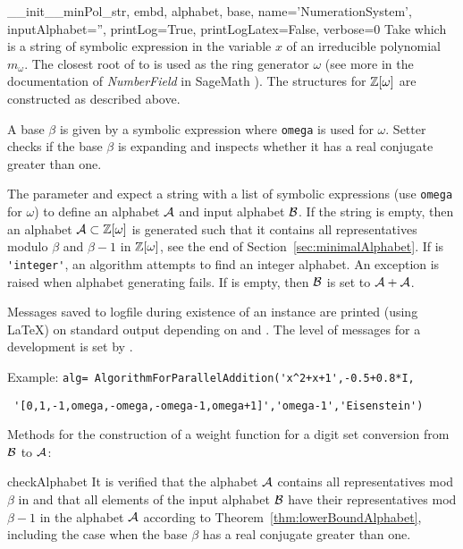 \begin{method}{\_\_init\_\_}{minPol\_str, embd, alphabet, base, name='NumerationSystem', inputAlphabet='', printLog=True, printLogLatex=False, verbose=0}
Take  which is a string of symbolic expression in the variable $x$ of an irreducible polynomial~$m_\omega$. The closest root of   to  is used as the ring generator $\omega$ (see more in the documentation of \emph{NumberField} in SageMath \cite{sage}). The structures for $\mathbb{Z}[\omega]$ are constructed as described above. 

A base $\beta$ is given by a symbolic expression  where \verb+omega+ is used for $\omega$.
Setter  checks if the base $\beta$ is expanding and inspects whether it has a real conjugate greater than one.

The parameter  and  expect a string with a list of symbolic expressions (use \verb+omega+ for $\omega$) to define an alphabet $\mathcal{A}$ and input alphabet $\mathcal{B}$. If the string  is empty, then an alphabet $\mathcal{A}\subset\mathbb{Z}[\omega]$ is generated such that it contains all representatives modulo $\beta$ and $\beta-1$ in $\mathbb{Z}[\omega]$, see the end of Section~\ref{sec:minimalAlphabet}. %
If  is \verb+'integer'+, %
 an algorithm attempts to find an integer alphabet. An exception is raised when alphabet generating fails. If   is empty, then $\mathcal{B}$ is set to $\mathcal{A}+\mathcal{A}$.

Messages saved to logfile during existence of an instance are printed (using \LaTeX) on standard output depending on  and . The level of messages for a development is set by .

Example:
\verb|alg= AlgorithmForParallelAddition('x^2+x+1',-0.5+0.8*I,|

\verb| '[0,1,-1,omega,-omega,-omega-1,omega+1]','omega-1','Eisenstein')|
\end{method}

Methods for the construction of a weight function for a digit set conversion from $\mathcal{B}$ to $\mathcal{A}$:
\begin{method}{checkAlphabet}{}
It is verified that the alphabet $\mathcal{A}$ contains all representatives mod $\beta$ in  and that all elements of the input alphabet $\mathcal{B}$ have their representatives mod $\beta-1$ in the alphabet $\mathcal{A}$ according to Theorem~\ref{thm:lowerBoundAlphabet}, including the case when the base $\beta$ has a real conjugate greater than one.
\end{method}

